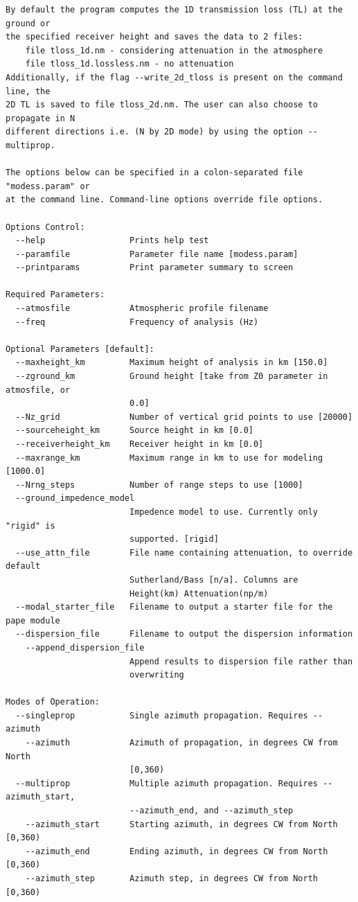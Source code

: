\begin{verbatim}
By default the program computes the 1D transmission loss (TL) at the ground or
the specified receiver height and saves the data to 2 files:
    file tloss_1d.nm - considering attenuation in the atmosphere
    file tloss_1d.lossless.nm - no attenuation
Additionally, if the flag --write_2d_tloss is present on the command line, the
2D TL is saved to file tloss_2d.nm. The user can also choose to propagate in N
different directions i.e. (N by 2D mode) by using the option --multiprop.

The options below can be specified in a colon-separated file "modess.param" or
at the command line. Command-line options override file options.

Options Control:
  --help                 Prints help test
  --paramfile            Parameter file name [modess.param]
  --printparams          Print parameter summary to screen

Required Parameters:
  --atmosfile            Atmospheric profile filename
  --freq                 Frequency of analysis (Hz)

Optional Parameters [default]:
  --maxheight_km         Maximum height of analysis in km [150.0]
  --zground_km           Ground height [take from Z0 parameter in atmosfile, or
                         0.0]
  --Nz_grid              Number of vertical grid points to use [20000]
  --sourceheight_km      Source height in km [0.0]
  --receiverheight_km    Receiver height in km [0.0]
  --maxrange_km          Maximum range in km to use for modeling [1000.0]
  --Nrng_steps           Number of range steps to use [1000]
  --ground_impedence_model
                         Impedence model to use. Currently only "rigid" is
                         supported. [rigid]
  --use_attn_file        File name containing attenuation, to override default
                         Sutherland/Bass [n/a]. Columns are
                         Height(km) Attenuation(np/m)
  --modal_starter_file   Filename to output a starter file for the pape module
  --dispersion_file      Filename to output the dispersion information
    --append_dispersion_file
                         Append results to dispersion file rather than
                         overwriting

Modes of Operation:
  --singleprop           Single azimuth propagation. Requires --azimuth
    --azimuth            Azimuth of propagation, in degrees CW from North
                         [0,360)
  --multiprop            Multiple azimuth propagation. Requires --azimuth_start,
                         --azimuth_end, and --azimuth_step
    --azimuth_start      Starting azimuth, in degrees CW from North [0,360)
    --azimuth_end        Ending azimuth, in degrees CW from North [0,360)
    --azimuth_step       Azimuth step, in degrees CW from North [0,360)


\end{verbatim}
